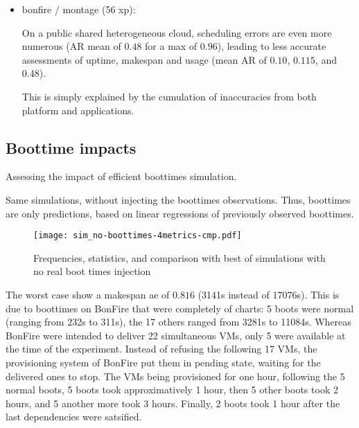 \begin{itemize}
 \item bonfire / montage (56 xp): 
 
      
      
      
 
      On a public shared heterogeneous cloud, scheduling errors are even more numerous 
      (AR mean of $0.48$ for a max of $0.96$), leading to less accurate assessments
      of uptime, makespan and usage (mean AR of $0.10$, $0.115$, and $0.48$).
      
      This is simply explained by the cumulation of inaccuracies from 
      both platform and applications. 
\end{itemize}



\subsection{Boottime impacts}

Assessing the impact of efficient boottimes simulation.

Same simulations, without injecting the boottimes observations. 
Thus, boottimes are only predictions, based on linear regressions of previously
observed boottimes.

\begin{figure}
  \centering
  \texttt{[image: sim\_no-boottimes-4metrics-cmp.pdf]}

  

  

  

  \caption{Frequencies, statistics, and comparison with best of simulations with no real boot times 
  injection}

\end{figure} 

The worst case show a makespan ae of $0.816$ (3141s instead of 17076s). 
This is due to boottimes on BonFire that were completely of charts: 
5 boots were normal (ranging from 232s to 311s), 
the 17 others ranged from 3281s to 11084s.
Whereas BonFire were intended to deliver 22 simultaneous VMs, only 5 were available
at the time of the experiment. Instead of refusing the following 17 VMs, the
provisioning system of BonFire put them in pending state, waiting for the delivered
ones to stop. The VMs being provisioned for one hour, following the 5 normal boots, 
5 boots took approximatively 1 hour, then 5 other boots took 2 hours,
and 5 another more took 3 hours. Finally, 2 boots took 1 hour after the last 
dependencies were satsified.

